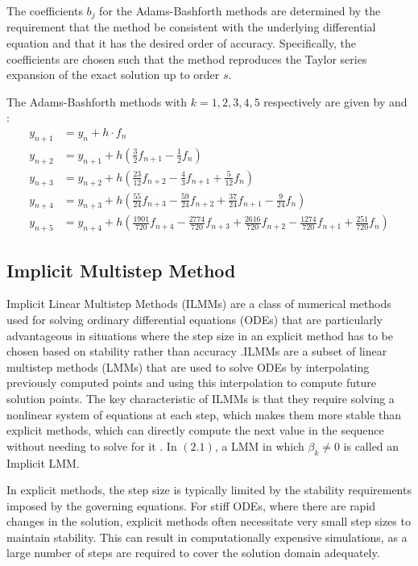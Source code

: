 The coefficients $b_j$ for the Adams-Bashforth methods are determined by the requirement that the method be consistent with the underlying differential equation and that it has the desired order of accuracy. Specifically, the coefficients are chosen such that the method reproduces the Taylor series expansion of the exact solution up to order $s$.

The Adams-Bashforth methods with $k=1,2,3,4,5$ respectively are given by \cite{butcher2003numerical} and \cite{hairer1993solving}:
\begin{align}
  y_{n+1} & = y_n + h \cdot f_n \\
  y_{n+2} & = y_{n+1} + h \left(\frac{3}{2}f_{n+1} - \frac{1}{2}f_{n}\right) \\
  y_{n+3} & = y_{n+2} + h \left(\frac{23}{12}f_{n+2} - \frac{4}{3}f_{n+1} + \frac{5}{12}f_{n}\right) \\
  y_{n+4} & = y_{n+3} + h \left(\frac{55}{24}f_{n+3} - \frac{59}{24}f_{n+2} + \frac{37}{24}f_{n+1} - \frac{9}{24}f_{n}\right) \\
  y_{n+5} & = y_{n+4} + h \left(\frac{1901}{720}f_{n+4} - \frac{2774}{720}f_{n+3} + \frac{2616}{720}f_{n+2} - \frac{1274}{720}f_{n+1} + \frac{251}{720}f_{n}\right)
\end{align}


\subsection{Implicit Multistep Method}
Implicit Linear Multistep Methods (ILMMs) are a class of numerical methods used for solving ordinary differential equations (ODEs) that are particularly advantageous in situations where the step size in an explicit method has to be chosen based on stability rather than accuracy \cite{alexander}.ILMMs are a subset of linear multistep methods (LMMs) that are used to solve ODEs by interpolating previously computed points and using this interpolation to compute future solution points. The key characteristic of ILMMs is that they require solving a nonlinear system of equations at each step, which makes them more stable than explicit methods, which can directly compute the next value in the sequence without needing to solve for it \cite{keller2020discovery}. In $(2.1)$, a LMM in which $\beta_k \neq 0$ is called an Implicit LMM.

In explicit methods, the step size is typically limited by the stability requirements imposed by the governing equations. For stiff ODEs, where there are rapid changes in the solution, explicit methods often necessitate very small step sizes to maintain stability. This can result in computationally expensive simulations, as a large number of steps are required to cover the solution domain adequately.

